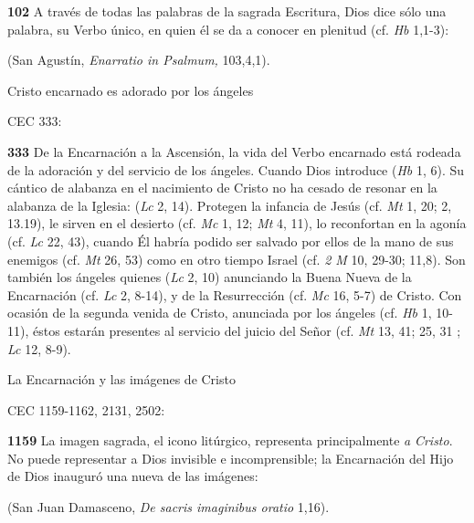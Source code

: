 \begin{body}
\begin{body}
\textbf{102} A través de todas las palabras de la sagrada Escritura, Dios dice sólo una palabra, su Verbo único, en quien él se da a conocer en plenitud (cf. \emph{Hb} 1,1-3):

 (San Agustín, \emph{Enarratio in Psalmum,} 103,4,1).

Cristo encarnado es adorado por los ángeles

CEC 333:

\textbf{333} De la Encarnación a la Ascensión, la vida del Verbo encarnado está rodeada de la adoración y del servicio de los ángeles. Cuando Dios introduce  (\emph{Hb} 1, 6). Su cántico de alabanza en el nacimiento de Cristo no ha cesado de resonar en la alabanza de la Iglesia:  (\emph{Lc} 2, 14). Protegen la infancia de Jesús (cf. \emph{Mt} 1, 20; 2, 13.19), le sirven en el desierto (cf. \emph{Mc} 1, 12; \emph{Mt} 4, 11), lo reconfortan en la agonía (cf. \emph{Lc} 22, 43), cuando Él habría podido ser salvado por ellos de la mano de sus enemigos (cf. \emph{Mt} 26, 53) como en otro tiempo Israel (cf. \emph{2 M} 10, 29-30; 11,8). Son también los ángeles quienes  (\emph{Lc} 2, 10) anunciando la Buena Nueva de la Encarnación (cf. \emph{Lc} 2, 8-14), y de la Resurrección (cf. \emph{Mc} 16, 5-7) de Cristo. Con ocasión de la segunda venida de Cristo, anunciada por los ángeles (cf. \emph{Hb} 1, 10-11), éstos estarán presentes al servicio del juicio del Señor (cf. \emph{Mt} 13, 41; 25, 31 ; \emph{Lc} 12, 8-9).

La Encarnación y las imágenes de Cristo

CEC 1159-1162, 2131, 2502:

\textbf{1159} La imagen sagrada, el icono litúrgico, representa principalmente \emph{a} \emph{Cristo}. No puede representar a Dios invisible e incomprensible; la Encarnación del Hijo de Dios inauguró una nueva  de las imágenes:

 (San Juan Damasceno, \emph{De sacris imaginibus oratio} 1,16).


\end{body}
\end{body}
